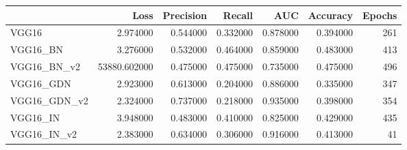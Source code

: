 \begin{tabular}{lrrrrrr}
\toprule
 & Loss & Precision & Recall & AUC & Accuracy & Epochs \\
\midrule
VGG16 & 2.974000 & 0.544000 & 0.332000 & 0.878000 & 0.394000 & 261 \\
VGG16_BN & 3.276000 & 0.532000 & 0.464000 & 0.859000 & 0.483000 & 413 \\
VGG16_BN_v2 & 53880.602000 & 0.475000 & 0.475000 & 0.735000 & 0.475000 & 496 \\
VGG16_GDN & 2.923000 & 0.613000 & 0.204000 & 0.886000 & 0.335000 & 347 \\
VGG16_GDN_v2 & 2.324000 & 0.737000 & 0.218000 & 0.935000 & 0.398000 & 354 \\
VGG16_IN & 3.948000 & 0.483000 & 0.410000 & 0.825000 & 0.429000 & 435 \\
VGG16_IN_v2 & 2.383000 & 0.634000 & 0.306000 & 0.916000 & 0.413000 & 41 \\
\bottomrule
\end{tabular}
